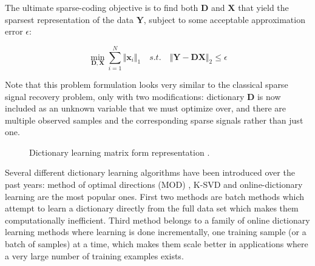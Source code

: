 \documentclass[journal]{IEEEtran}
\begin{document}
The ultimate sparse-coding objective is to find both $\boldsymbol{D}$ and $\boldsymbol{X}$ that yield the sparsest representation of the data $\boldsymbol{Y}$, subject to some acceptable approximation error $\epsilon$:

\begin{equation} \label{eq:dictionary_learning}
	\min\limits_{\boldsymbol{D}, \boldsymbol{X}}\sum\limits_{i=1}^N \Vert \boldsymbol{x}_i\Vert_1 \quad s.t.\quad \Vert \boldsymbol{Y}-\boldsymbol{D}\boldsymbol{X}\Vert_2\leq \epsilon
\end{equation}

Note that this problem formulation looks very similar to the classical sparse signal recovery problem, only with two modifications: dictionary $\boldsymbol{D}$ is now included as an unknown variable that we must optimize over, and there are multiple observed samples and the corresponding sparse signals rather than just one. 
%
\begin{figure}[h]
	
		
	\caption{Dictionary learning matrix form representation \cite{Rish2015}.}
	
	\label{fig:dictionary_learning}
	
\end{figure}
Several different dictionary learning algorithms have been introduced over the past years: method of optimal directions (MOD) \cite{engan1999method}, K-SVD \cite{Aharon2006} and online-dictionary learning \cite{mairal2010online} are the most popular ones. First two methods are batch methods which attempt to learn a dictionary directly from the full data set which makes them computationally inefficient. Third method belongs to a family of online dictionary learning methods where learning is done incrementally, one training sample (or a batch of samples) at a time, which makes them scale better in applications where a very large number of training examples exists.
\end{document}
